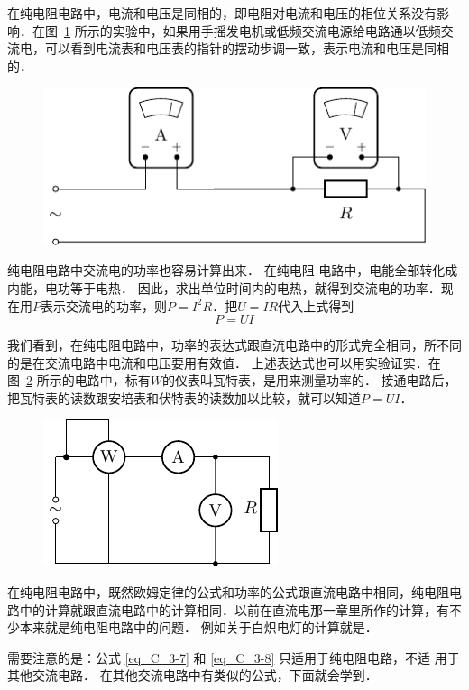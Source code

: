 在纯电阻电路中，电流和电压是同相的，即电阻对电流和电压的相位关系没有影响．在图~\ref{fig_C_3-12} 所示的实验中，如果用手摇发电机或低频交流电源给电路通以低频交流电，可以看到电流表和电压表的指针的摆动步调一致，表示电流和电压是同相的．
\begin{figure}[htbp]
    \centering
    \includegraphics{fig/C/3-12.pdf}
    \caption{}\label{fig_C_3-12}
\end{figure}

纯电阻电路中交流电的功率也容易计算出来．
在纯电阻
电路中，电能全部转化成内能，电功等于电热．
因此，求出单位时间内的电热，就得到交流电的功率．现在用$P$表示交流电的功率，则$P=I^2R$．把$U=IR$代入上式得到
\begin{equation}\label{eq_C_3-8}
    P=UI
\end{equation}

我们看到，在纯电阻电路中，功率的表达式跟直流电路中的形式完全相同，所不同的是在交流电路中电流和电压要用有效值．
上述表达式也可以用实验证实．在图~\ref{fig_C_3-13} 所示的电路中，标有$W$的仪表叫瓦特表，是用来测量功率的．
接通电路后，把瓦特表的读数跟安培表和伏特表的读数加以比较，就可以知道$P=UI$．
\begin{figure}[htbp]
    \centering
    \includegraphics{fig/C/3-13.pdf}
    \caption{}\label{fig_C_3-13}
\end{figure}

在纯电阻电路中，既然欧姆定律的公式和功率的公式跟直流电路中相同，纯电阻电路中的计算就跟直流电路中的计算相同．以前在直流电那一章里所作的计算，有不少本来就是纯电阻电路中的问题．
例如关于白炽电灯的计算就是．

需要注意的是：公式 \eqref{eq_C_3-7} 和 \eqref{eq_C_3-8} 只适用于纯电阻电路，不适
用于其他交流电路．
在其他交流电路中有类似的公式，下面就会学到．	
	
